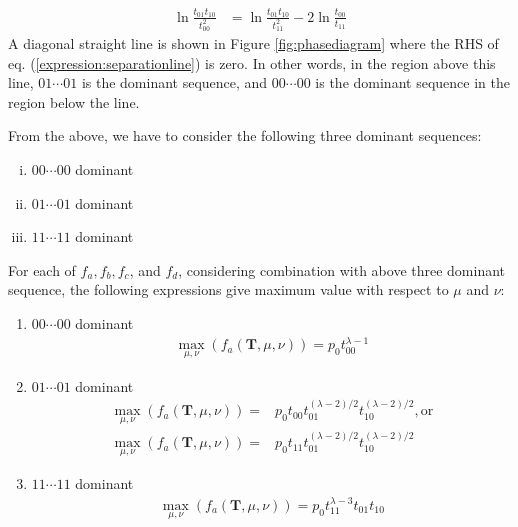 ﻿\documentclass[a4paper,xelatex,english]{bxjsarticle}
\newcommand\mib[1]{\boldsymbol{#1}}
\begin{document}
\begin{align}
	\ln \frac{t_{01}t_{10}}{t_{00}^{2}} 
	&= 
	\ln \frac{t_{01}t_{10}}{t_{11}^{2}} - 2 \ln \frac{t_{00}}{t_{11}}
	\label{expression:separationline}
\end{align}
A diagonal straight line is shown in Figure \ref{fig:phasediagram} where the RHS of eq. (\ref{expression:separationline}) is zero.  
In other words, in the region above this line, $01 \cdots 01$ is the dominant sequence, and $00 \cdots 00$ is the dominant sequence in the region below the line. 


From the above, we have to consider the following three dominant sequences:
\begin{enumerate}[i)]
	\item $00 \cdots 00$ dominant 
	\item $01 \cdots 01$ dominant 
	\item $11 \cdots 11$ dominant 
\end{enumerate}
For each of $f_a, f_b, f_c$, and $f_d$, considering combination with above three dominant sequence, 
the following expressions give maximum value with respect to $\mu$ and $\nu$:

\begin{enumerate}[{a)}-i)]
	\item $00 \cdots 00$ dominant 
	\begin{align}
	\max_{\mu, \nu}(f_{a}(\mib{T}, \mu, \nu)) = p_{0} t_{00}^{\lambda - 1}
	\end{align}
	\item $01 \cdots 01$ dominant 
	\begin{align}
	\max_{\mu, \nu}(f_{a}(\mib{T}, \mu, \nu)) = & p_{0} t_{00} t_{01}^{(\lambda - 2) / 2} t_{10}^{(\lambda - 2) / 2}, {\textrm{or}} \\
	\max_{\mu, \nu}(f_{a}(\mib{T}, \mu, \nu)) = & p_{0} t_{11} t_{01}^{(\lambda - 2) / 2} t_{10}^{(\lambda - 2) / 2}
	\end{align}
	\item $11 \cdots 11$ dominant 
	\begin{align}
	\max_{\mu, \nu}(f_{a}(\mib{T}, \mu, \nu)) = p_{0} t_{11}^{\lambda - 3} t_{01} t_{10} \label{expression:neg1}
	\end{align}
\end{enumerate}
\end{document}
